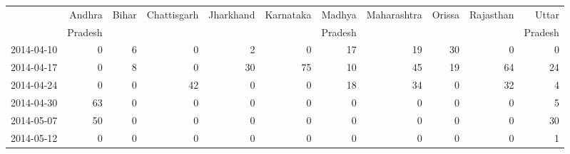 \begin{tabular}{rrrrrrrrrrr}
  \hline
 & Andhra  & Bihar & Chattisgarh & Jharkhand & Karnataka & Madhya  & Maharashtra & Orissa & Rajasthan & Uttar  \\ 
 &  Pradesh &  &  &  &  &  Pradesh &  &  &  &  Pradesh \\ 
  \hline
2014-04-10 &   0 &   6 &   0 &   2 &   0 &  17 &  19 &  30 &   0 &   0 \\ 
  2014-04-17 &   0 &   8 &   0 &  30 &  75 &  10 &  45 &  19 &  64 &  24 \\ 
  2014-04-24 &   0 &   0 &  42 &   0 &   0 &  18 &  34 &   0 &  32 &   4 \\ 
  2014-04-30 &  63 &   0 &   0 &   0 &   0 &   0 &   0 &   0 &   0 &   5 \\ 
  2014-05-07 &  50 &   0 &   0 &   0 &   0 &   0 &   0 &   0 &   0 &  30 \\ 
  2014-05-12 &   0 &   0 &   0 &   0 &   0 &   0 &   0 &   0 &   0 &   1 \\ 
   \hline
\end{tabular}


